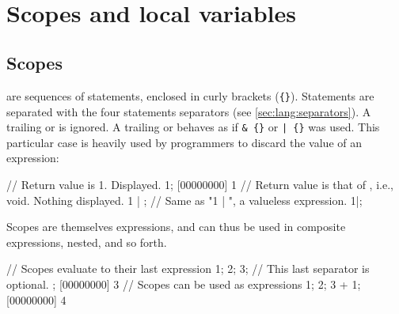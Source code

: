 \begin{operatorTable}[\ifx\ifHtml\undefined\small\fi]
  \operatoraeq\\\operatorinf\\\operatorinfeq\\\operatorsup\\\operatorsupeq
  \\\hline
  \operatorin\\\operatornotin
  \\\hline
  \operatorand
  \\\hline
  \operatoror
  \\\hline
  \operatorass\\\operatorsiass
  \\\hline
  \operatorinca\\\operatordeca\\\operatorainc\\\operatoradec
\end{operatorTable}


\section{Scopes and local variables}

\subsection{Scopes}

 are sequences of statements, enclosed in curly brackets
(\lstinline|{}|). Statements are separated with the four statements
separators (see \autoref{sec:lang:separators}).  A trailing \samp{;} or
\samp{,} is ignored.  A trailing \samp{\&} or \samp{|} behaves as if
\lstinline|& {}| or \lstinline'| {}' was used.  This particular case is
heavily used by \us programmers to discard the value of an expression:

\begin{urbiscript}
// Return value is 1.  Displayed.
1;
[00000000] 1
// Return value is that of {}, i.e., void.  Nothing displayed.
1 | {};
// Same as "1 | {}", a valueless expression.
1|;
\end{urbiscript}

Scopes are themselves expressions, and can thus be used in composite
expressions, nested, and so forth.

\begin{urbiscript}
// Scopes evaluate to their last expression
{
  1;
  2;
  3; // This last separator is optional.
};
[00000000] 3
// Scopes can be used as expressions
{1; 2; 3} + 1;
[00000000] 4
\end{urbiscript}

